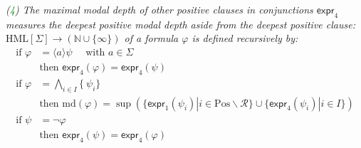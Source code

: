 \begin{isabellebody}
\begin{isamarkuptext}
\textit{(\textcolor{green}{4}) The \textnormal{maximal modal depth of other positive clauses in conjunctions} $\textsf{expr}_4$ measures the deepest positive modal depth aside from the deepest positive clause: $\text{HML}[\Sigma] \rightarrow (\mathbb{N} \cup \{\infty\})$ of a formula $\varphi$ is defined recursively by:}
\textit{
\begin{align*}
    \text{if } \varphi &= \langle a \rangle \psi \quad \text{ with } a \in \Sigma \\
    & \text{then } \textsf{expr}_4(\varphi) = \textsf{expr}_4(\psi) \\
    \text{if } \varphi &= \bigwedge_{i \in I} \{\ \psi_i \} \\
    & \text{then } \text{md}(\varphi) = \sup(\{\textsf{expr}_1(\psi_i)|i\in\text{Pos}\backslash \mathcal{R}\}\cup\{\textsf{expr}_4(\psi_i) | i \in I\}) \\
    \text{if } \psi &= \neg \varphi \\
    & \text{then } \textsf{expr}_4(\psi) = \textsf{expr}_4(\varphi)
\end{align*}
}


\end{isamarkuptext}
\end{isabellebody}

